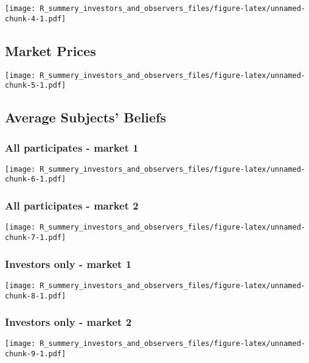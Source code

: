 \documentclass[]{article}
\begin{document}
\texttt{[image: R\_summery\_investors\_and\_observers\_files/figure-latex/unnamed-chunk-4-1.pdf]}

\hypertarget{market-prices}{%
\subsection{Market Prices}\label{market-prices}}

\texttt{[image: R\_summery\_investors\_and\_observers\_files/figure-latex/unnamed-chunk-5-1.pdf]}

\hypertarget{average-subjects-beliefs}{%
\subsection{Average Subjects' Beliefs}\label{average-subjects-beliefs}}

\hypertarget{all-participates---market-1}{%
\subsubsection{All participates - market
1}\label{all-participates---market-1}}

\texttt{[image: R\_summery\_investors\_and\_observers\_files/figure-latex/unnamed-chunk-6-1.pdf]}

\hypertarget{all-participates---market-2}{%
\subsubsection{All participates - market
2}\label{all-participates---market-2}}

\texttt{[image: R\_summery\_investors\_and\_observers\_files/figure-latex/unnamed-chunk-7-1.pdf]}

\hypertarget{investors-only---market-1}{%
\subsubsection{Investors only - market
1}\label{investors-only---market-1}}

\texttt{[image: R\_summery\_investors\_and\_observers\_files/figure-latex/unnamed-chunk-8-1.pdf]}

\hypertarget{investors-only---market-2}{%
\subsubsection{Investors only - market
2}\label{investors-only---market-2}}

\texttt{[image: R\_summery\_investors\_and\_observers\_files/figure-latex/unnamed-chunk-9-1.pdf]}
\end{document}
